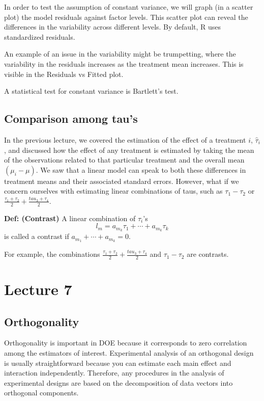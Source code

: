 \documentclass[12pt, oneside]{article}
\begin{document}
In order to test the assumption of constant variance, we will graph (in a scatter plot) the model residuals against factor levels. This scatter plot can reveal the differences in the variability across different levels. By default, R uses standardized residuals.

An example of an issue in the variability might be trumpetting, where the variability in the residuals increases as the treatment mean increases. This is visible in the Residuals vs Fitted plot. 

A statistical test for constant variance is Bartlett's test.

\subsection{Comparison among tau's}

In the previous lecture, we covered the estimation of the effect of a treatment $i$, $\hat{\tau}_{i}$, and discussed 
how the effect of any treatment is estimated by taking the mean of the observations related to that particular treatment 
and the overall mean $(\mu_{i} - \mu)$. We saw that a linear model can speak to both these differences in treatment means 
and their associated standard errors. However, what if we concern ourselves with estimating linear combinations of taus, 
such as $\tau_{1} - \tau_{2}$ or $\frac{\tau_{1} + \tau_{2}}{2} + \frac{tau_{3} + \tau_{4}}{2}$. \newline


\textbf{Def: (Contrast)} A linear combination of $\tau_{i}$'s \[l_{m} = a_{m_{k}}\tau_{1} + \cdots + a_{m_{k}} \tau_{k}\]is called a contrast if $a_{m_1} + \cdots + a_{m_{k}} = 0$. 

For example, the combinations $\frac{\tau_{1} + \tau_{2}}{2} + \frac{tau_{3} + \tau_{4}}{2}$ and $\tau_{1} - \tau_{2}$ are contrasts. 

\section{Lecture 7}

\subsection{Orthogonality}

Orthogonality is important in DOE because it corresponds to zero correlation among the estimators of interest. Experimental analysis of an orthogonal design is usually straightforward because you can estimate each main effect and interaction independently. Therefore, any procedures in the analysis of experimental designs are based on the decomposition of data vectors into orthogonal components. 
\end{document}
